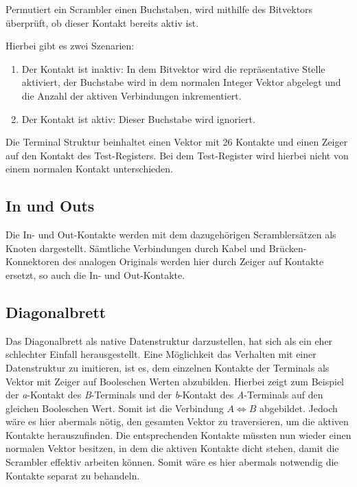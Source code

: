 \noindent


Permutiert ein Scrambler einen Buchstaben, wird mithilfe des Bitvektors überprüft, ob dieser Kontakt bereits aktiv ist.

Hierbei gibt es zwei Szenarien:
\begin{enumerate}
	\item Der Kontakt ist inaktiv: In dem Bitvektor wird die repräsentative Stelle aktiviert, der Buchstabe wird in dem normalen Integer Vektor abgelegt und die Anzahl der aktiven Verbindungen inkrementiert.
	
	\item Der Kontakt ist aktiv: Dieser Buchstabe wird ignoriert. 
\end{enumerate}

Die Terminal Struktur beinhaltet einen Vektor mit 26 Kontakte und einen Zeiger auf den Kontakt des Test-Registers.
Bei dem Test-Register wird hierbei nicht von einem \glqq normalen\grqq{} Kontakt unterschieden.

\subsection{In und Outs}\label{subsec:impl_in_und_outs}
Die In- und Out-Kontakte werden mit dem dazugehörigen Scramblersätzen als Knoten dargestellt.
Sämtliche Verbindungen durch Kabel und Brücken-Konnektoren des analogen Originals werden hier durch Zeiger auf Kontakte ersetzt, so auch die In- und Out-Kontakte.

\subsection{Diagonalbrett}\label{subsec:impl_diagonal_board}
Das Diagonalbrett als native Datenstruktur darzustellen, hat sich als ein eher schlechter Einfall herausgestellt.
Eine Möglichkeit das Verhalten mit einer Datenstruktur zu imitieren, ist es, dem einzelnen Kontakte der Terminals als Vektor mit Zeiger auf Booleschen Werten abzubilden.
Hierbei zeigt zum Beispiel der \emph{a}-Kontakt des \emph{B}-Terminals und der \emph{b}-Kontakt des \emph{A}-Terminals auf den gleichen Booleschen Wert.
Somit ist die Verbindung $A \Leftrightarrow B$ abgebildet.
Jedoch wäre es hier abermals nötig, den gesamten Vektor zu traversieren, um die aktiven Kontakte herauszufinden.
Die entsprechenden Kontakte müssten nun wieder einen normalen Vektor besitzen, in dem die aktiven Kontakte \glqq dicht\grqq{} stehen, damit die Scrambler effektiv arbeiten können.
Somit wäre es hier abermals notwendig die Kontakte separat zu behandeln.

